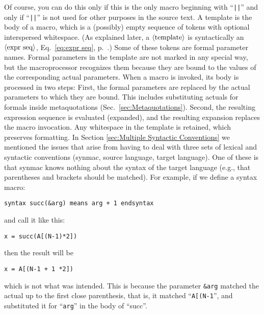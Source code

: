 \documentclass[12pt]{article}
\begin{document}
Of course, you can do this only if this is the only macro beginning with ``\lstinline"||"'' and only if ``\lstinline"||"'' is not used for other purposes in the source text. 
A template is the body of a macro, which is a (possibly) empty sequence of tokens with optional interspersed whitespace.
(As explained later, a $\langle\mbox{template}\rangle$ is syntactically an $\langle\mbox{expr seq}\rangle$, Eq.\ \ref{eq:expr seq}, p.\ \pageref{eq:expr seq}.)
Some of these tokens are formal parameter names.
Formal parameters in the template are not marked in any special way, but the macroprocessor recognizes them because they are bound to the values of the corresponding actual parameters.
When a macro is invoked, its body is processed in two steps:
First, the formal parameters are replaced by the actual parameters to which they are bound.
This includes substituting actuals for formals inside metaquotations (Sec.\ \ref{sec:Metaquotations}).
Second, the resulting expression sequence is evaluated (expanded), and the resulting expansion replaces the macro invocation. Any whitespace in the template is retained, which preserves formatting.
In Section \ref{sec:Multiple Syntactic Conventions} we mentioned the issues that arise from having to deal with three sets of lexical and syntactic conventions (synmac, source language, target language).
One of these is that synmac knows nothing about the syntax of the target language (e.g., that parentheses and brackets should be matched).
For example, if we define a syntax macro:
\begin{lstlisting}[frame=single]
syntax succ(&arg) means arg + 1 endsyntax
\end{lstlisting}
and call it like this:
\begin{lstlisting}[frame=single]
x = succ(A[(N-1)*2])
\end{lstlisting}
then the result will be
\begin{lstlisting}[frame=single]
x = A[(N-1 + 1 *2])
\end{lstlisting}
which is not what was intended.
This is because the parameter \lstinline"&arg" matched the actual up to the first close parenthesis, that is, it matched ``\lstinline"A[(N-1"'', and substituted it for ``\lstinline"arg"'' in the body of ``succ''.
\end{document}
